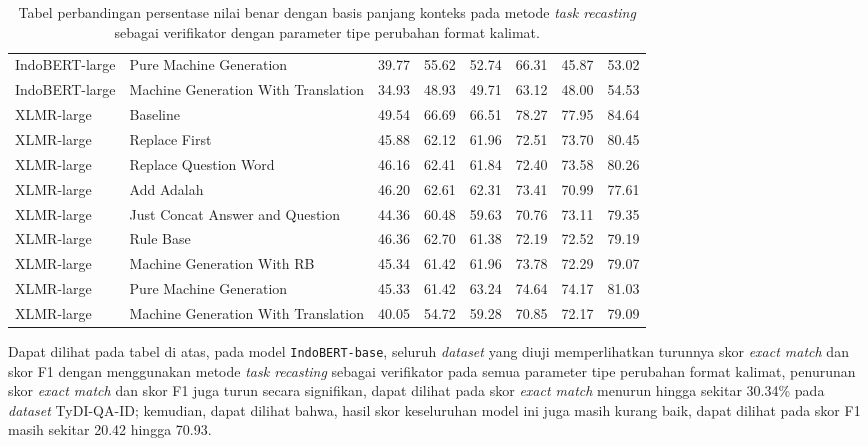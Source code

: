\begin{table}[H]
\begin{tabular}{llrrrrrr}
IndoBERT-large &             Pure Machine Generation & 39.77 & 55.62 & 52.74 & 66.31 & 45.87 & 53.02 \\
IndoBERT-large & Machine Generation With Translation & 34.93 & 48.93 & 49.71 & 63.12 & 48.00 & 54.53 \\
\hline
    XLMR-large &                            Baseline & 49.54 & 66.69 & 66.51 & 78.27 & 77.95 & 84.64 \\
    XLMR-large &                       Replace First & 45.88 & 62.12 & 61.96 & 72.51 & 73.70 & 80.45 \\
    XLMR-large &               Replace Question Word & 46.16 & 62.41 & 61.84 & 72.40 & 73.58 & 80.26 \\
    XLMR-large &                          Add Adalah & 46.20 & 62.61 & 62.31 & 73.41 & 70.99 & 77.61 \\
    XLMR-large &     Just Concat Answer and Question & 44.36 & 60.48 & 59.63 & 70.76 & 73.11 & 79.35 \\
    XLMR-large &                           Rule Base & 46.36 & 62.70 & 61.38 & 72.19 & 72.52 & 79.19 \\
    XLMR-large &          Machine Generation With RB & 45.34 & 61.42 & 61.96 & 73.78 & 72.29 & 79.07 \\
    XLMR-large &             Pure Machine Generation & 45.33 & 61.42 & 63.24 & 74.64 & 74.17 & 81.03 \\
    XLMR-large & Machine Generation With Translation & 40.05 & 54.72 & 59.28 & 70.85 & 72.17 & 79.09 \\
\bottomrule
\end{tabular}
\caption{Tabel perbandingan persentase nilai benar dengan basis panjang konteks pada metode \emph{task recasting} sebagai verifikator dengan parameter tipe perubahan format kalimat.}
\end{table}

Dapat dilihat pada tabel di atas, pada model \texttt{IndoBERT-base}, seluruh \emph{dataset} yang diuji memperlihatkan turunnya skor \emph{exact match} dan skor F1 dengan menggunakan metode \emph{task recasting} sebagai verifikator pada semua parameter tipe perubahan format kalimat, penurunan skor \emph{exact match} dan skor F1 juga turun secara signifikan, dapat dilihat pada skor \emph{exact match} menurun hingga sekitar 30.34\% pada \emph{dataset} TyDI-QA-ID; kemudian, dapat dilihat bahwa, hasil skor keseluruhan model ini juga masih kurang baik, dapat dilihat pada skor F1 masih sekitar 20.42 hingga 70.93.

